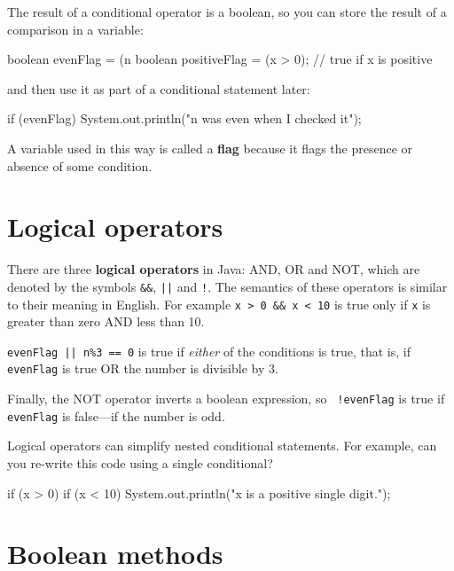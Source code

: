 
The result of a conditional operator is a boolean,
so you can store the result of a comparison in a variable:

\begin{code}
    boolean evenFlag = (n%
    boolean positiveFlag = (x > 0);    // true if x is positive
\end{code}

and then use it as part of a conditional statement later:

\begin{code}
    if (evenFlag) {
      System.out.println("n was even when I checked it");
    }
\end{code}

A variable used in this way is called a {\bf flag}
because it flags the presence or absence of some condition.


\section{Logical operators}

There are three {\bf logical operators} in Java: AND, OR and NOT,
which are denoted by the symbols {\tt \&\&}, {\tt ||} and
{\tt !}.  The semantics of these operators is similar
to their meaning in English.  For example {\tt x > 0 \&\& x < 10}
is true only if {\tt x} is greater than zero AND less than 10.

{\tt evenFlag || n\%3 == 0} is true if {\em either} of
the conditions is true, that is, if {\tt evenFlag} is true OR the
number is divisible by 3.

Finally, the NOT operator inverts a boolean expression, so {\tt
  !evenFlag} is true if {\tt evenFlag} is false---if the number is
odd.


Logical operators can simplify nested
conditional statements.  For example, can you re-write
this code using a single conditional?

\begin{code}
    if (x > 0) {
      if (x < 10) {
        System.out.println("x is a positive single digit.");
      }
    }
\end{code}


\section{Boolean methods}
\label{boolean}

